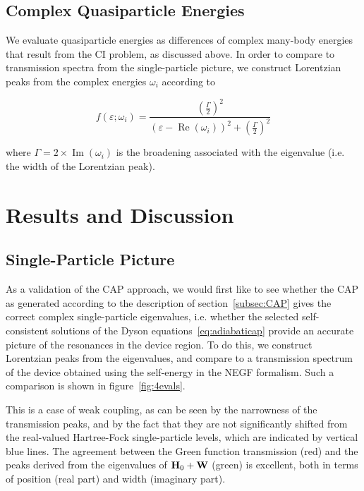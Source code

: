 \subsection{Complex Quasiparticle Energies}

We evaluate quasiparticle energies as differences of complex many-body energies
that result from the \ac{CI} problem, as discussed above. In order to compare
to transmission spectra from the single-particle picture, we construct
Lorentzian peaks from the complex energies $\omega_i$ according to

\begin{equation}
	f(\varepsilon;\omega_i)
	= \frac{\left( \frac{\Gamma}{2} \right)^2}
	       {(\varepsilon - \operatorname{Re}(\omega_i))^2
	       + \left( \frac{\Gamma}{2} \right)^2}
	\label{eq:lobro}
\end{equation}

where $\Gamma = 2 \times \operatorname{Im}(\omega_i)$ is the broadening
associated with the eigenvalue (i.e. the width of the Lorentzian peak).

\section{Results and Discussion}
\label{sec:results}

\subsection{Single-Particle Picture}
\label{subsec:SingleParticle}

As a validation of the \ac{CAP} approach, we would first like to see whether
the \ac{CAP} as generated according to the description of
section~\ref{subsec:CAP} gives the correct complex single-particle eigenvalues,
i.e. whether the selected self-consistent solutions of the Dyson
equations~\ref{eq:adiabaticap} provide an accurate picture of the resonances
in the device region. To do this, we construct Lorentzian peaks from the
eigenvalues, and compare to a transmission spectrum of the device obtained
using the self-energy in the \ac{NEGF} formalism. Such a comparison is shown in
figure~\ref{fig:4evals}.

This is a case of weak coupling, as can be seen by the narrowness of the
transmission peaks, and by the fact that they are not significantly shifted
from the real-valued Hartree-Fock single-particle levels, which are indicated
by vertical blue lines. The agreement between the Green function transmission
(red) and the peaks derived from the eigenvalues of $\mathbf{H}_0 + \mathbf{W}$ (green)
is excellent, both in terms of position (real part) and width (imaginary part).

